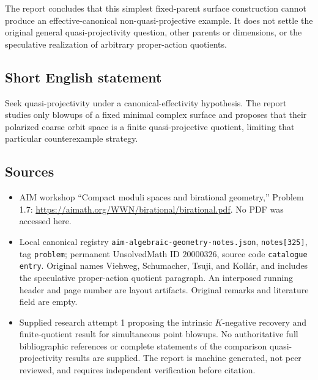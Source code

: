 \documentclass[11pt]{article}
\begin{document}
The report concludes that this simplest fixed-parent surface construction cannot produce an effective-canonical non-quasi-projective example. It does not settle the original general quasi-projectivity question, other parents or dimensions, or the speculative realization of arbitrary proper-action quotients.
\subsection{Short English statement}
Seek quasi-projectivity under a canonical-effectivity hypothesis. The report studies only blowups of a fixed minimal complex surface and proposes that their polarized coarse orbit space is a finite quasi-projective quotient, limiting that particular counterexample strategy.
\subsection{Sources}
\begin{itemize}
\item AIM workshop ``Compact moduli spaces and birational geometry,'' Problem 1.7: \url{https://aimath.org/WWN/birational/birational.pdf}. No PDF was accessed here.
\item Local canonical registry \texttt{aim-algebraic-geometry-notes.json}, \texttt{notes[325]}, tag \texttt{problem}; permanent UnsolvedMath ID \(20000326\), source code \texttt{catalogue entry}. Original names Viehweg, Schumacher, Tsuji, and Koll\'ar, and includes the speculative proper-action quotient paragraph. An interposed running header and page number are layout artifacts. Original remarks and literature field are empty.
\item Supplied research attempt 1 proposing the intrinsic \(K\)-negative recovery and finite-quotient result for simultaneous point blowups. No authoritative full bibliographic references or complete statements of the comparison quasi-projectivity results are supplied. The report is machine generated, not peer reviewed, and requires independent verification before citation.
\end{itemize}
\end{document}
